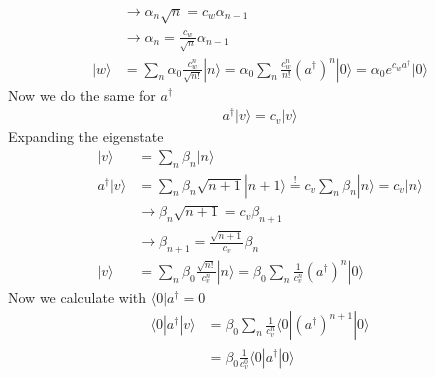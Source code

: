 \documentclass[../main.tex]{subfiles}
\begin{document}
\begin{enumerate}
\begin{align}
    &\rightarrow\alpha_n\sqrt{n}=c_w\alpha_{n-1}\\
    &\rightarrow\alpha_n=\frac{c_w}{\sqrt{n}}\alpha_{n-1}\\
    |w\rangle
    &=\sum_n\alpha_0\frac{c_w^n}{\sqrt{n!}}|n\rangle
    =\alpha_0\sum_n\frac{c_w^n}{n!}(a^\dagger)^n|0\rangle
    =\alpha_0 e^{c_wa^\dagger}|0\rangle
\end{align}
Now we do the same for $a^\dagger$
\begin{align}
    a^\dagger|v\rangle=c_v|v\rangle
\end{align}
Expanding the eigenstate 
\begin{align}
    |v\rangle
    &=\sum_n\beta_n|n\rangle\\
    a^\dagger|v\rangle
    &=\sum_n\beta_n\sqrt{n+1}|n+1\rangle\overset{!}{=}c_v\sum_n\beta_n|n\rangle=c_v|n\rangle\\
    &\rightarrow\beta_{n}\sqrt{n+1}=c_v\beta_{n+1}\\
    &\rightarrow\beta_{n+1}=\frac{\sqrt{n+1}}{c_v}\beta_{n}\\
    |v\rangle
    &=\sum_n\beta_0\frac{\sqrt{n!}}{c_v^n}|n\rangle=\beta_0\sum_n\frac{1}{c_v^n}(a^\dagger)^n|0\rangle
\end{align}
Now we calculate with $\langle 0|a^\dagger=0$
\begin{align}
    \langle 0|a^\dagger|v\rangle&=\beta_0\sum_n\frac{1}{c_v^n}\langle 0|(a^\dagger)^{n+1}|0\rangle\\
    &=\beta_0\frac{1}{c_v^0}\langle 0|a^\dagger|0\rangle\\
\end{align}
\end{enumerate}
\end{document}
